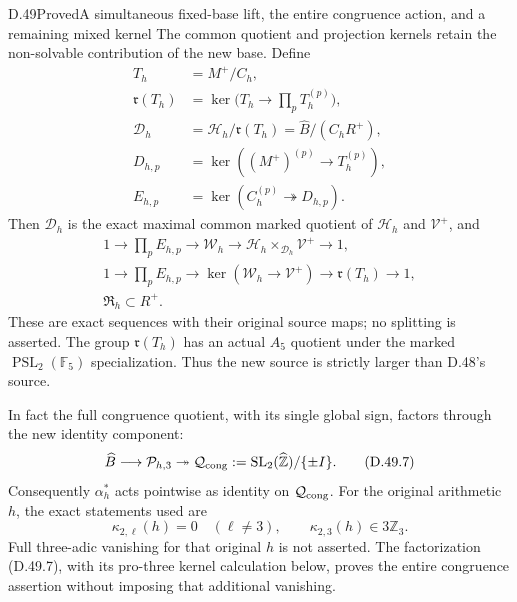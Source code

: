 \begin{statement}{D.49}{Proved}{A simultaneous fixed-base lift, the entire congruence action, and a remaining mixed kernel}
The common quotient and projection kernels retain the
non-solvable contribution of the new base. Define
\[
 \begin{aligned}
 T_h&=M^+/C_h,\\
 \mathfrak r(T_h)&=\ker\bigl(T_h\to\prod_pT_h^{(p)}\bigr),\\
 \mathcal D_h&=\mathcal H_h/\mathfrak r(T_h)
                 =\widehat B/(C_hR^+),\\
 D_{h,p}&=\ker((M^+)^{(p)}\to T_h^{(p)}),\\
 E_{h,p}&=\ker(C_h^{(p)}\twoheadrightarrow D_{h,p}).
 \end{aligned}
 \tag{D.49.5}
\]
Then \(\mathcal D_h\) is the exact maximal common marked
quotient of \(\mathcal H_h\) and \(\mathcal V^+\), and
\[
 \begin{gathered}
 1\longrightarrow\prod_pE_{h,p}\longrightarrow\mathcal W_h
   \longrightarrow
       \mathcal H_h\times_{\mathcal D_h}\mathcal V^+
   \longrightarrow1,\\
 1\longrightarrow\prod_pE_{h,p}
   \longrightarrow\ker(\mathcal W_h\to\mathcal V^+)
   \longrightarrow\mathfrak r(T_h)\longrightarrow1,\\
 \mathfrak R_h\subset R^+.
 \end{gathered}
 \tag{D.49.6}
\]
These are exact sequences with their original source maps;
no splitting is asserted. The group \(\mathfrak r(T_h)\)
has an actual \(A_5\) quotient under the marked
\(\operatorname{PSL}_2(\mathbb F_5)\) specialization.
Thus the new source is strictly larger than D.48's source.

In fact the full congruence quotient, with its single
global sign, factors through the new identity component:
\[
 \widehat B\longrightarrow\mathcal P_{h,3}
        \twoheadrightarrow
 \mathcal Q_{\rm cong}
       :=\operatorname{SL}_2(\widehat{\mathbb Z})/\{\pm I\}.
 \tag{D.49.7}
\]
Consequently \(\alpha_h^*\) acts pointwise as identity on
\(\mathcal Q_{\rm cong}\). For the original arithmetic
\(h\), the exact statements used are
\[
 \kappa_{2,\ell}(h)=0\quad(\ell\ne3),\qquad
 \kappa_{2,3}(h)\in3\mathbb Z_3.
 \tag{D.49.8}
\]
Full three-adic vanishing for that original \(h\) is not
asserted. The factorization (D.49.7), with its pro-three
kernel calculation below, proves the entire congruence
assertion without imposing that additional vanishing.


\end{statement}
